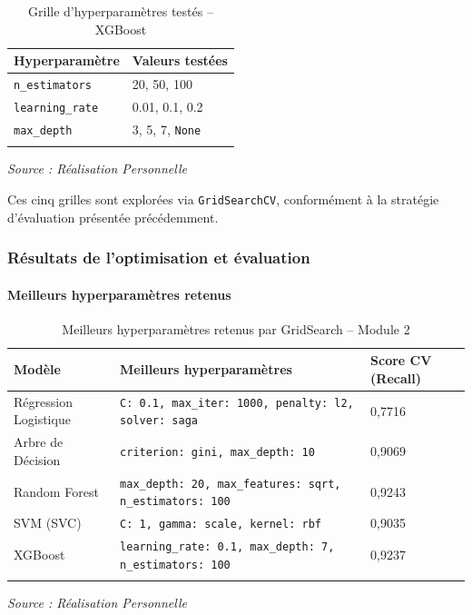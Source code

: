 \documentclass[a4paper,12pt, oneside]{article}
\begin{document}
\begin{longtable}{|p{3.5cm}|p{9.5cm}|}

\hline
\textbf{Hyperparamètre} & \textbf{Valeurs testées} \\
\hline

\texttt{n\_estimators} & 20, 50, 100 \\
\hline
\texttt{learning\_rate} & 0.01, 0.1, 0.2 \\
\hline
\texttt{max\_depth} & 3, 5, 7, \texttt{None} \\
\hline
\caption{Grille d'hyperparamètres testés -- XGBoost} \\
\end{longtable}
\begin{center}
\vspace{-0.85cm}
\textit{Source : Réalisation Personnelle}
\end{center}

Ces cinq grilles sont explorées via \texttt{GridSearchCV}, conformément à la stratégie d'évaluation présentée précédemment.


\subsubsection{Résultats de l'optimisation et évaluation}

\paragraph{Meilleurs hyperparamètres retenus\\}

\begin{longtable}{|p{3.5cm}|p{7cm}|p{1.8cm}|}
\hline
\textbf{Modèle} & \textbf{Meilleurs hyperparamètres} & \textbf{Score CV (Recall)} \\
\hline
Régression Logistique & \texttt{C: 0.1, max\_iter: 1000, penalty: l2, solver: saga} & 0,7716 \\
\hline
Arbre de Décision & \texttt{criterion: gini, max\_depth: 10} & 0,9069 \\
\hline
Random Forest & \texttt{max\_depth: 20, max\_features: sqrt, n\_estimators: 100} & 0,9243 \\
\hline
SVM (SVC) & \texttt{C: 1, gamma: scale, kernel: rbf} & 0,9035 \\
\hline
XGBoost & \texttt{learning\_rate: 0.1, max\_depth: 7, n\_estimators: 100} & 0,9237 \\
\hline
\caption{Meilleurs hyperparamètres retenus par GridSearch -- Module 2}
\end{longtable}
\begin{center}
\vspace{-0.85cm}
\textit{Source : Réalisation Personnelle}
\end{center}
\end{document}
